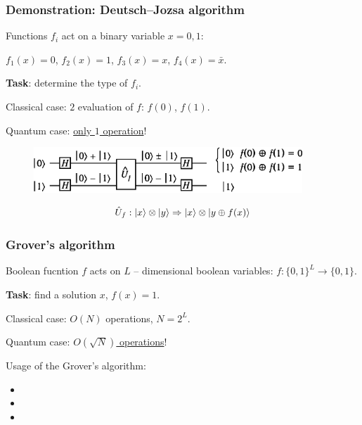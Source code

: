 \documentclass{beamer}
\DeclarePairedDelimiter\ket{\lvert}{\rangle}
\begin{document}
\begin{frame}
\frametitle{Demonstration: Deutsch–Jozsa algorithm}
Functions $f_i$ act on a binary variable $x = 0,1$:

\medskip

$f_1(x) = 0$, $f_2(x) = 1$, $f_3(x) = x$, $f_4(x) = \bar{x}$.

\medskip

{\bf Task}: determine the type of $f_i$.

\medskip

Classical case: {\bf $2$} evaluation of $f$: $f(0)$, $f(1)$.

Quantum case: \underline{only $1$ operation}!

\begin{figure}
\includegraphics[width=0.9\textwidth]{pic/jozsa.eps}
\end{figure}

$$\hat{U}_f: \ket{x} \otimes \ket{y} \Rightarrow \ket{x} \otimes \ket{y \oplus f(x)}$$

\end{frame}


\begin{frame}
\frametitle{Grover's algorithm}

Boolean fucntion $f$ acts on $L$ -- dimensional boolean variables: $f: \{0, 1\}^L \to \{0, 1\}$.

\medskip

{\bf Task}: find a solution $x$, $f(x) = 1$.

\medskip

Classical case: $O(N)$ operations, $N = 2^L$.

\medskip 

Quantum case: \underline{$O(\sqrt{N})$ operations}!

\medskip

Usage of the Grover's algorithm:
\begin{itemize}
\item
\item
\item
\end{itemize}

\end{frame}
\end{document}
